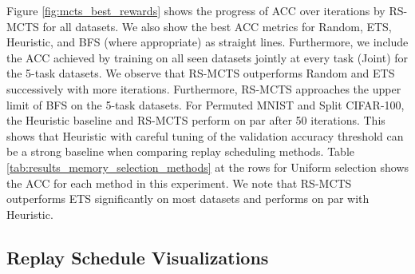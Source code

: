 Figure \ref{fig:mcts_best_rewards} shows the progress of ACC over %
iterations by RS-MCTS for all datasets. We also show the best ACC metrics for Random, ETS, Heuristic, and BFS (where appropriate) as straight lines. 
Furthermore, we include the ACC achieved by training on all seen datasets jointly at every task (Joint) for the 5-task datasets.
We observe that RS-MCTS outperforms Random and ETS successively with more iterations. Furthermore, RS-MCTS approaches the upper limit of BFS on the 5-task datasets. For Permuted MNIST and Split CIFAR-100, the Heuristic baseline and RS-MCTS perform on par after 50 iterations. This shows that Heuristic with careful tuning of the validation accuracy threshold can be a strong baseline when comparing replay scheduling methods. Table \ref{tab:results_memory_selection_methods} at the rows for Uniform selection shows the ACC for each method in this experiment. We note that RS-MCTS outperforms ETS significantly on most datasets and performs on par with Heuristic.


%
\subsection{Replay Schedule Visualizations}
\label{paperC:sec:replay_schedule_visualization}

